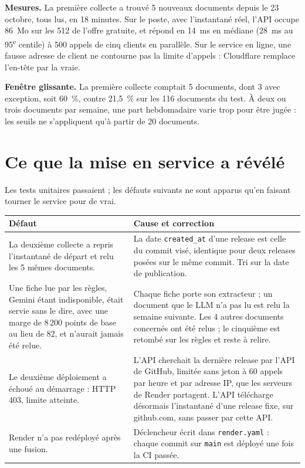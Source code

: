 \documentclass[11pt,a4paper]{article}
\begin{document}
\textbf{Mesures.} La première collecte a trouvé 5 nouveaux documents depuis le 23 octobre, tous lus, en 18 minutes. Sur le poste, avec l'instantané réel, l'API occupe 86~Mo sur les 512 de l'offre gratuite, et répond en 14~ms en médiane (28~ms au 95\textsuperscript{e} centile) à 500 appels de cinq clients en parallèle. Sur le service en ligne, une fausse adresse de client ne contourne pas la limite d'appels : Cloudflare remplace l'en-tête par la vraie.

\textbf{Fenêtre glissante.} La première collecte comptait 5 documents, dont 3 avec exception, soit 60~\%, contre 21,5~\% sur les 116 documents du test. À deux ou trois documents par semaine, une part hebdomadaire varie trop pour être jugée : les seuils ne s'appliquent qu'à partir de 20 documents.

\section{Ce que la mise en service a révélé}

Les tests unitaires passaient ; les défauts suivants ne sont apparus qu'en faisant tourner le service pour de vrai.

\begin{table}[H]
\small
\begin{tabularx}{\linewidth}{YY}
\toprule
\textbf{Défaut} & \textbf{Cause et correction} \\
\midrule
La deuxième collecte a repris l'instantané de départ et relu les 5 mêmes documents. & La date \texttt{created\_at} d'une release est celle du commit visé, identique pour deux releases posées sur le même commit. Tri sur la date de publication. \\
Une fiche lue par les règles, Gemini étant indisponible, était servie sans le dire, avec une marge de 8\,200 points de base au lieu de 82, et n'aurait jamais été relue. & Chaque fiche porte son extracteur ; un document que le LLM n'a pas lu est relu la semaine suivante. Les 4 autres documents concernés ont été relus ; le cinquième est retombé sur les règles et reste à relire. \\
Le deuxième déploiement a échoué au démarrage : HTTP 403, limite atteinte. & L'API cherchait la dernière release par l'API de GitHub, limitée sans jeton à 60 appels par heure et par adresse IP, que les serveurs de Render partagent. L'API télécharge désormais l'instantané d'une release fixe, sur github.com, sans passer par cette API. \\
Render n'a pas redéployé après une fusion. & Déclencheur écrit dans \texttt{render.yaml} : chaque commit sur \texttt{main} est déployé une fois la CI passée. \\
\bottomrule
\end{tabularx}
\end{table}
\end{document}
